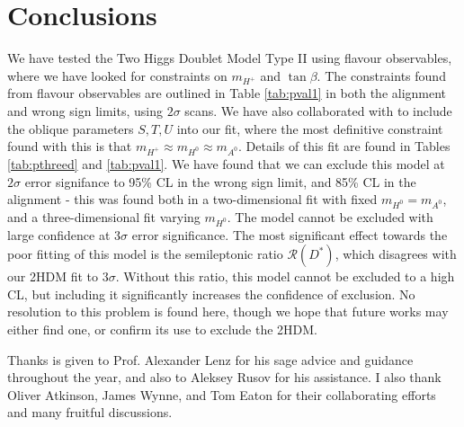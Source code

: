 \documentclass[a4paper,12pt]{article}
\begin{document}
\section{Conclusions}
We have tested the Two Higgs Doublet Model Type II using flavour observables, where we have looked for constraints on $m_{H^+}$ and $\tan\beta$. 
The constraints found from flavour observables are outlined in Table \ref{tab:pval1} in both the alignment and wrong sign limits, using $2\sigma$ scans. 
We have also collaborated with \cite{james} to include the oblique parameters $S,T,U$ into our fit, where the most definitive constraint found with this is that $m_{H^+}\approx m_{H^0}\approx m_{A^0}$. 
Details of this fit are found in Tables \ref{tab:pthreed} and \ref{tab:pval1}. 
We have found that we can exclude this model at $2\sigma$ error signifance to 95\% CL in the wrong sign limit, and 85\% CL in the alignment - this was found both in a two-dimensional fit with fixed $m_{H^0}=m_{A^0}$, and a three-dimensional fit varying $m_{H^0}$.
The model cannot be excluded with large confidence at $3\sigma$ error significance.
The most significant effect towards the poor fitting of this model is the semileptonic ratio $\mathcal{R}(D^*)$, which disagrees with our 2HDM fit to $3\sigma$. 
Without this ratio, this model cannot be excluded to a high CL, but including it significantly increases the confidence of exclusion. 
No resolution to this problem is found here, though we hope that future works may either find one, or confirm its use to exclude the 2HDM. 

\acknowledgments
Thanks is given to Prof. Alexander Lenz for his sage advice and guidance throughout the year, and also to Aleksey Rusov for his assistance. 
I also thank Oliver Atkinson, James Wynne, and Tom Eaton for their collaborating efforts and many fruitful discussions.

%
\end{document}
